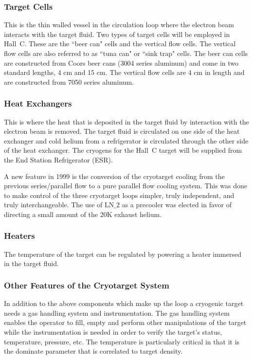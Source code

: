 \subsubsection{Target Cells} This is the thin walled vessel in the circulation loop
where the electron beam interacts with the target fluid. Two types
of target cells will be employed in Hall~C. These are the ``beer can" cells
and the vertical flow cells. The vertical flow cells are also referred
to as ``tuna can" or ``sink trap" cells.
The beer can cells are constructed from Coors beer cans (3004 series aluminum)
and come in two standard lengths, 4 cm and 15 cm.
The vertical flow cells are 4 cm in length and are constructed from 7050
series aluminum.
\subsubsection{Heat Exchangers} This is where the heat that is deposited in the target
fluid by interaction with the electron beam is removed. The target fluid is
circulated on one side of the heat exchanger and cold helium
from a refrigerator is circulated through the other side of the heat exchanger.
The cryogens for the Hall~C target will be supplied from the End Station
Refrigerator (ESR).

A new feature in 1999 is the conversion of the cryotarget cooling from
the previous series/parallel flow to a pure parallel flow cooling
system.  This was done to make control of the three cryotarget loops
simpler, truly independent, and truly interchangeable.  The use of
LN$\_2$ as a precooler was elected in favor of directing a small
amount of the 20K exhaust helium.  

\subsubsection{Heaters} The temperature of the target can be regulated by powering
a heater immersed in the target fluid.

\subsubsection{Other Features of the Cryotarget System}  In addition to the above components which make up the loop a cryogenic target
needs a gas handling system and instrumentation. The gas handling system
enables the operator to fill, empty and perform other manipulations of the
target while the instrumentation is needed in order to verify the target's
status, temperature, pressure, etc. The temperature is particularly critical
in that it is the dominate parameter that is correlated to target density.


